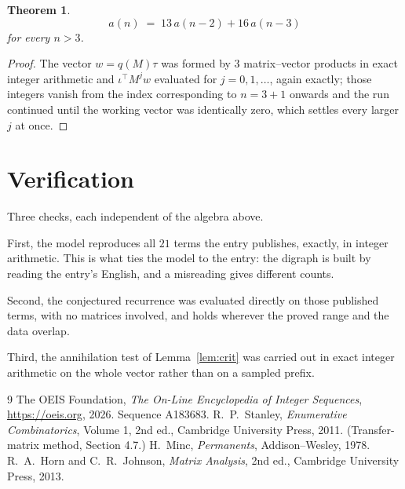 \documentclass[11pt,a4paper]{article}
\theoremstyle{plain}
\newtheorem{theorem}{Theorem}
\theoremstyle{definition}
\begin{document}
\begin{theorem}
\[
a(n)\;=\;13\,a(n-2) + 16\,a(n-3)
\]
for every $n>3$.
\end{theorem}

\begin{proof}
The vector $w=q(M)\tau$ was formed by $3$ matrix--vector products in exact integer
arithmetic and $\iota^{\!\top}M^{j}w$ evaluated for $j=0,1,\dots$, again exactly; those
integers vanish from the index corresponding to $n=3+1$ onwards and the run continued
until the working vector was identically zero, which settles every larger $j$ at once.
\end{proof}

\section{Verification}

Three checks, each independent of the algebra above.

First, the model reproduces all $21$ terms the entry publishes, exactly, in integer
arithmetic. This is what ties the model to the entry: the digraph is built by reading the
entry's English, and a misreading gives different counts.

Second, the conjectured recurrence was evaluated directly on those published terms, with no
matrices involved, and holds wherever the proved range and the data overlap.

Third, the annihilation test of Lemma~\ref{lem:crit} was carried out in exact integer
arithmetic on the whole vector rather than on a sampled prefix.

\begin{thebibliography}{9}
 The OEIS Foundation, \emph{The On-Line Encyclopedia of Integer
Sequences}, \url{https://oeis.org}, 2026. Sequence A183683.
 R.~P.~Stanley, \emph{Enumerative Combinatorics}, Volume 1, 2nd ed.,
Cambridge University Press, 2011. (Transfer-matrix method, Section 4.7.)
 H.~Minc, \emph{Permanents}, Addison--Wesley, 1978.
 R.~A.~Horn and C.~R.~Johnson, \emph{Matrix Analysis}, 2nd ed., Cambridge
University Press, 2013.
\end{thebibliography}
\end{document}
